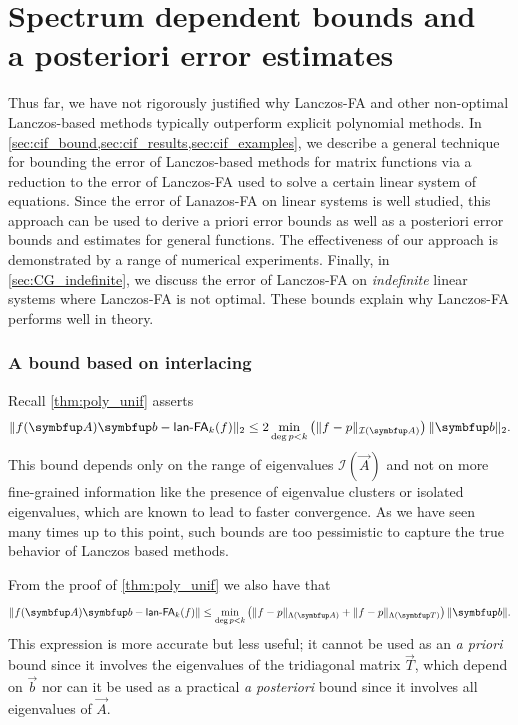 \chapter{Spectrum dependent bounds and \\a posteriori error estimates}
\label{chap:CIF}


Thus far, we have not rigorously justified why Lanczos-FA and other non-optimal Lanczos-based methods typically outperform explicit polynomial methods. 
In \cref{sec:cif_bound,sec:cif_results,sec:cif_examples}, we describe a general technique for bounding the error of Lanczos-based methods for matrix functions via a reduction to the error of Lanczos-FA used to solve a certain linear system of equations.
Since the error of Lanazos-FA on linear systems is well studied, this approach can be used to derive a priori error bounds as well as a posteriori error bounds and estimates for general functions.
The effectiveness of our approach is demonstrated by a range of numerical experiments.
Finally, in \cref{sec:CG_indefinite}, we discuss the error of Lanczos-FA on \emph{indefinite} linear systems where Lanczos-FA is not optimal.
These bounds explain why Lanczos-FA performs well in theory.


\iffalse
\subsection*{A bound based on interlacing}
\label{ex:unif_discrete}


Recall \cref{thm:poly_unif} asserts
\begin{equation}
\label{eqn:poly_unif}
    \| f(\vec{A}) \vec{b} - \lan_k(f) \|_2 
    \leq  2 \min_{\deg p<k} \left( \| f-p \|_{\mathcal{I}(\vec{A})}  \right) \| \vec{b} \|_2.
\end{equation}
This bound depends only on the range of eigenvalues \(\mathcal{I}(\vec{A})\) and not on more fine-grained information like the presence of eigenvalue clusters or isolated eigenvalues, which are known to lead to faster convergence.
As we have seen many times up to this point, such bounds are too pessimistic to capture the true behavior of Lanczos based methods.

From the proof of \cref{thm:poly_unif} we also have that
\begin{equation}
    \label{eqn:triangle_ineq1}
    \| f(\vec{A}) \vec{b} - \lan_k(f) \|
    \leq \min_{\deg p< k} \left( \| f-p \|_{\Lambda(\vec{A})} + \| f - p \|_{\Lambda(\vec{T})} \right) \| \vec{b} \|. 
\end{equation}
This expression is more accurate but less useful; it cannot be used as an \emph{a priori} bound since it involves the eigenvalues of the tridiagonal matrix $\vec{T}$, which depend on $\vec{b}$ nor can it be used as a practical \emph{a posteriori} bound since it involves all  eigenvalues of \( \vec{A} \).


